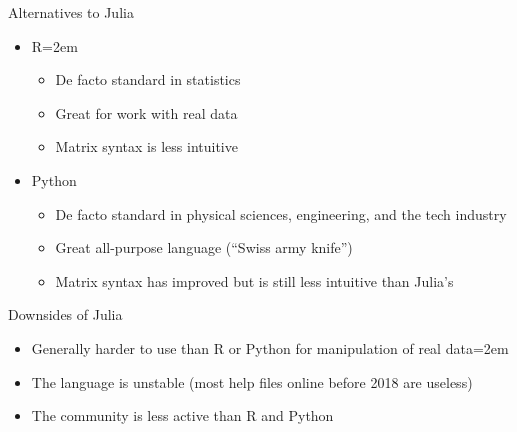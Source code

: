 \documentclass{beamer}
\begin{document}
\begin{frame}{Alternatives to Julia}
\begin{itemize}
    \item R\itemsep=2em
    \begin{itemize}
        \item De facto standard in statistics
        \item Great for work with real data
        \item Matrix syntax is less intuitive
    \end{itemize}
    \item<2-> Python
    \begin{itemize}
        \item De facto standard in physical sciences, engineering, and the tech industry
        \item Great all-purpose language (``Swiss army knife'')
        \item Matrix syntax has improved but is still less intuitive than Julia's
    \end{itemize}
\end{itemize}
\end{frame}

\begin{frame}{Downsides of Julia}
\begin{itemize}
    \item Generally harder to use than R or Python for manipulation of real data\itemsep=2em
    \item The language is unstable (most help files online before 2018 are useless)
    \item The community is less active than R and Python
\end{itemize}
\end{frame}
\end{document}
